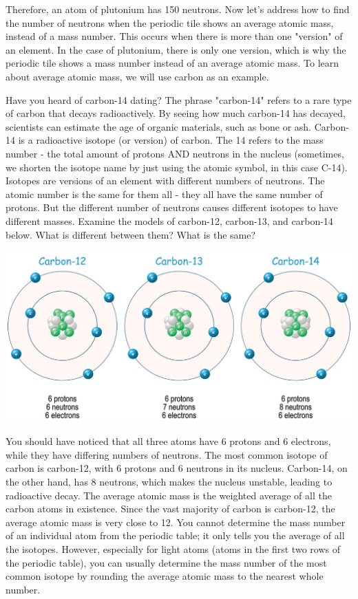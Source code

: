 Therefore, an atom of plutonium has 150 neutrons. Now let's address how to find
the number of neutrons when the periodic tile shows an average atomic mass, 
instead of a mass number. This occurs when there is more than one "version" of 
an element. In the case of plutonium, there is only one version, which is why 
the periodic tile shows a mass number instead of an average atomic mass. To 
learn about average atomic mass, we will use carbon as an example. 

Have you heard of carbon-14 dating? The phrase "carbon-14" refers to a rare
type of carbon that decays radioactively. By seeing how much carbon-14 has
decayed, scientists can estimate the age of organic materials, such as bone or
ash. Carbon-14 is a radioactive isotope (or version) of carbon. The 14 refers to
the mass number - the total amount of protons AND neutrons in the nucleus 
(sometimes, we shorten the isotope name by just using the atomic symbol, in 
this case C-14). Isotopes are versions of an element with different numbers of 
neutrons. The atomic number is the same for them all - they all have the same 
number of protons. But the different number of neutrons causes different 
isotopes to have different masses. Examine the models of carbon-12, carbon-13, 
and carbon-14 below. What is different between them? What is the same?

\begin{center}
\includegraphics[scale=0.35]{carbon_iso.png}
\end{center}

You should have noticed that all three atoms have 6 protons and 6 electrons, 
while they have differing numbers of neutrons. The most common isotope of carbon 
is carbon-12, with 6 protons and 6 neutrons in its nucleus. Carbon-14, on the 
other hand, has 8 neutrons, which makes the nucleus unstable, leading to 
radioactive decay. The average atomic mass 
is the weighted average of all the carbon atoms in existence. Since the vast
majority of carbon is carbon-12, the average atomic mass is very close to 12. 
You cannot determine the mass number of an individual atom from the periodic 
table; it only tells you the average of all the isotopes. However, especially 
for light atoms (atoms in the first two rows of the periodic table), you can 
usually determine the mass number of the most common isotope by rounding the 
average atomic mass to the nearest whole number.

